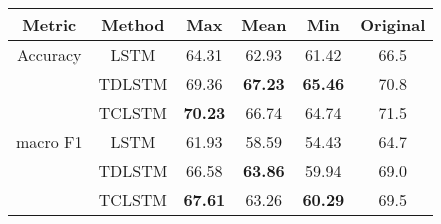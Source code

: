 \begin{tabular}{|c|c|c|c|c|c|}
\hline
Metric &    Method    &   Max &   Mean &   Min & Original \\
\hline
Accuracy & LSTM &  64.31 &  62.93 &  61.42 & 66.5 \\
& TDLSTM &  69.36 &  \textbf{67.23} &  \textbf{65.46} & 70.8 \\
& TCLSTM &  \textbf{70.23} &  66.74 &  64.74 & 71.5 \\
\hline
macro F1 & LSTM &  61.93 &  58.59 &  54.43 & 64.7 \\
& TDLSTM &  66.58 &  \textbf{63.86} &  59.94 & 69.0 \\
& TCLSTM &  \textbf{67.61} &  63.26 &  \textbf{60.29} & 69.5 \\
\hline
\end{tabular}